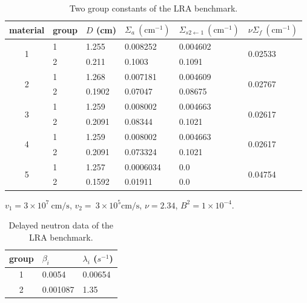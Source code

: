 \documentclass[review,number,sort&compress,12pt]{elsarticle}
\begin{document}
\begin{table}[H]
	\begin{threeparttable}	
		\centering
		\begin{tabular}{c|l|l|l|l|l}
			material & group  & $D$ (cm) & $\Sigma_{a} ~ (\text{cm}^{-1})$ & $\Sigma_{s2\gets 1}~ (\text{cm}^{-1})$ & $\nu\Sigma_{f}~ (\text{cm}^{-1})$ \\
			\hline
			\multirow{2}{*}{1}& 1   & 1.255  &  0.008252   & 0.004602 &  \multirow{2}{*}{0.02533} 	\\
			& 2   & 0.211  &  0.1003     &  0.1091  &  \\
			\hline
			\multirow{2}{*}{2}& 1   & 1.268  &  0.007181    & 0.004609  & \multirow{2}{*}{0.02767}  \\	
			& 2   & 0.1902 &  0.07047     & 0.08675   &  \\
			\hline
			
			\multirow{2}{*}{3}& 1   & 1.259  &  0.008002    & 0.004663 & \multirow{2}{*}{0.02617} \\	
			& 2   & 0.2091 &  0.08344     &   0.1021 &                          \\
			\hline
			\multirow{2}{*}{4}& 1   & 1.259  &  0.008002    & 0.004663 &  \multirow{2}{*}{0.02617} \\	
			& 2   & 0.2091 &  0.073324    & 0.1021   &                           \\
			\hline
			\multirow{2}{*}{5}& 1   & 1.257  &  0.0006034   &   0.0    & \multirow{2}{*}{0.04754}\\	
			& 2   & 0.1592 &   0.01911    &   0.0    &  \\
			\hline
		\end{tabular}

		\begin{tablenotes}
			\item $v_1 = 3\times10^{7} ~\text{cm/s} $,  $v_2 = ~3\times10^{5} \text{cm/s}$, $\nu=2.34$, $B^2=1\times{10}^{-4}$.
		\end{tablenotes}
	\end{threeparttable}
	\caption{Two group constants of the LRA benchmark.}
	\label{tab:two group data}
\end{table}


\begin{table}[H]
	\centering
	\begin{tabular}{c|l|l}
		group & $\beta_i$  & $\lambda_i$ ($s^{-1}$)  \\
		\hline
		1    &  0.0054 & 0.00654 \\
		2    &  0.001087 & 1.35  \\
		\hline
	\end{tabular}
	\caption{Delayed neutron data of the LRA benchmark.}
	\label{tab:precursor data}
\end{table}
\end{document}
